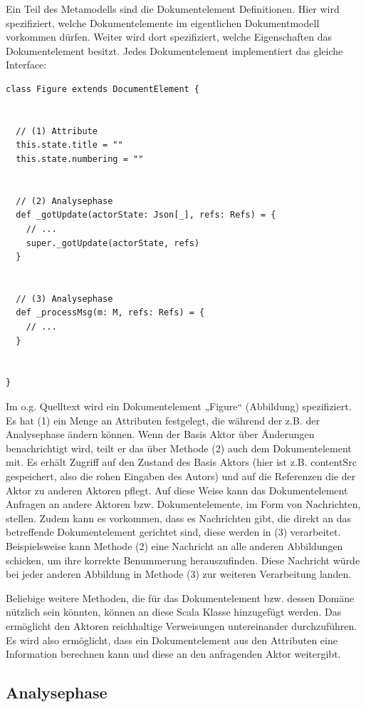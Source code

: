 Ein Teil des Metamodells sind die Dokumentelement Definitionen. Hier wird spezifiziert, welche Dokumentelemente im eigentlichen Dokumentmodell vorkommen dürfen. Weiter wird dort spezifiziert, welche Eigenschaften das Dokumentelement besitzt. Jedes Dokumentelement implementiert das gleiche Interface:

 
\begin{verbatim}
class Figure extends DocumentElement {


  // (1) Attribute
  this.state.title = ""
  this.state.numbering = ""


  // (2) Analysephase
  def _gotUpdate(actorState: Json[_], refs: Refs) = {
    // ...
    super._gotUpdate(actorState, refs)
  }


  // (3) Analysephase
  def _processMsg(m: M, refs: Refs) = {
    // ...
  }


}
\end{verbatim}
 
Im o.g. Quelltext wird ein Dokumentelement „Figure“ (Abbildung) spezifiziert. Es hat (1) ein Menge an Attributen festgelegt, die während der z.B. der Analysephase ändern können. Wenn der Basis Aktor über Änderungen benachrichtigt wird, teilt er das über Methode (2) auch dem Dokumentelement mit. Es erhält Zugriff auf den Zustand des Basis Aktors (hier ist z.B. contentSrc gespeichert, also die rohen Eingaben des Autors) und auf die Referenzen die der Aktor zu anderen Aktoren pflegt. Auf diese Weise kann das Dokumentelement Anfragen an andere Aktoren bzw. Dokumentelemente, im Form von Nachrichten, stellen. Zudem kann es vorkommen, dass es Nachrichten gibt, die direkt an das betreffende Dokumentelement gerichtet sind, diese werden in (3) verarbeitet. Beispielsweise kann Methode (2) eine Nachricht an alle anderen Abbildungen schicken, um ihre korrekte Benummerung herauszufinden. Diese Nachricht würde bei jeder anderen Abbildung in Methode (3) zur weiteren Verarbeitung landen.

 
Beliebige weitere Methoden, die für das Dokumentelement bzw. dessen Domäne nützlich sein könnten, können an diese Scala Klasse hinzugefügt werden. Das ermöglicht den Aktoren reichhaltige Verweisungen untereinander durchzuführen. Es wird also ermöglicht, dass ein Dokumentelement aus den Attributen eine Information berechnen kann und diese an den anfragenden Aktor weitergibt.

 
\subsection{Analysephase}\label{}
 
